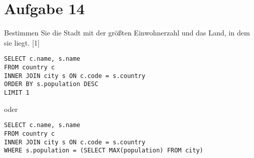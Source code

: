 \documentclass{article}
\begin{document}
	\section*{Aufgabe 14}
	Bestimmen Sie die Stadt mit der größten Einwohnerzahl und das Land, in dem sie liegt. [1]
	\begin{lstlisting}[style=sql,tabsize=2]
SELECT c.name, s.name 
FROM country c 
INNER JOIN city s ON c.code = s.country
ORDER BY s.population DESC
LIMIT 1
	\end{lstlisting}
	oder
	\begin{lstlisting}[style=sql, tabsize=2]
SELECT c.name, s.name
FROM country c 
INNER JOIN city s ON c.code = s.country 
WHERE s.population = (SELECT MAX(population) FROM city)
	\end{lstlisting}
	
\end{document}
